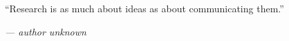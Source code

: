 \vspace*{\fill}
\centerline{\enquote{Research is as much about ideas as about communicating them.}}
\vspace{0.1cm}
\centerline{\hspace{6.5cm}\emph{--- author unknown}}
\vspace*{\fill}
